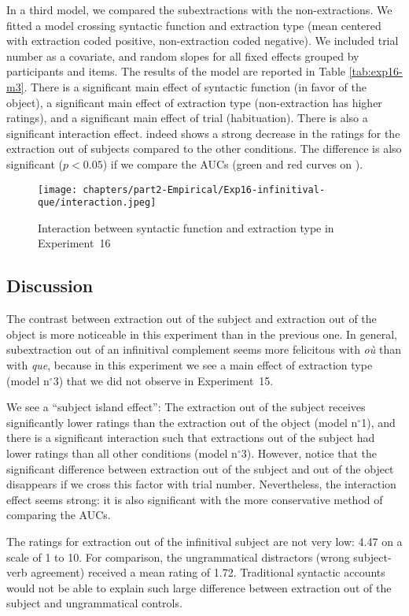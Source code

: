

In a third model, we compared the subextractions with the non-extractions. We fitted a model crossing syntactic function and extraction type (mean centered with extraction coded positive, non-extraction coded negative). We included trial number as a covariate, and random slopes for all fixed effects grouped by participants and items. The results of the model are reported in Table \ref{tab:exp16-m3}. 
There is a significant main effect of syntactic function (in favor of the object), a significant main effect of extraction type (non-extraction has higher ratings), and a significant main effect of trial (habituation). There is also a significant interaction effect.  indeed shows a strong decrease in the ratings for the extraction out of subjects compared to the other conditions. The difference is also significant ($p < 0.05$) if we compare the AUCs (green and red curves on ). 



\begin{figure}
    \centering
    \texttt{[image: chapters/part2-Empirical/Exp16-infinitival-que/interaction.jpeg]}
    \caption{Interaction between syntactic function and extraction type in Experiment~16}
    \label{fig:exp16-interaction}
\end{figure}

\subsection{Discussion}

The contrast between extraction out of the subject and extraction out of the object is more noticeable in this experiment than in the previous one. In general, subextraction out of an infinitival complement seems more felicitous with \emph{où} than with \emph{que}, because in this experiment we see a main effect of extraction type (model n$^{\circ}$3) that we did not observe in Experiment~15. 

We see a ``subject island effect'': The extraction out of the subject receives significantly lower ratings than the extraction out of the object (model n$^{\circ}$1), and there is a significant interaction such that extractions out of the subject had lower ratings than all other conditions (model n$^{\circ}$3). However, notice that the significant difference between extraction out of the subject and out of the object disappears if we cross this factor with trial number. Nevertheless, the interaction effect seems strong: it is also significant with the more conservative method of comparing the AUCs.

The ratings for extraction out of the infinitival subject are not very low: 4.47 on a scale of 1 to 10. For comparison, the ungrammatical distractors (wrong subject-verb agreement) received a mean rating of 1.72. Traditional syntactic accounts would not be able to explain such large difference between extraction out of the subject and ungrammatical controls.

